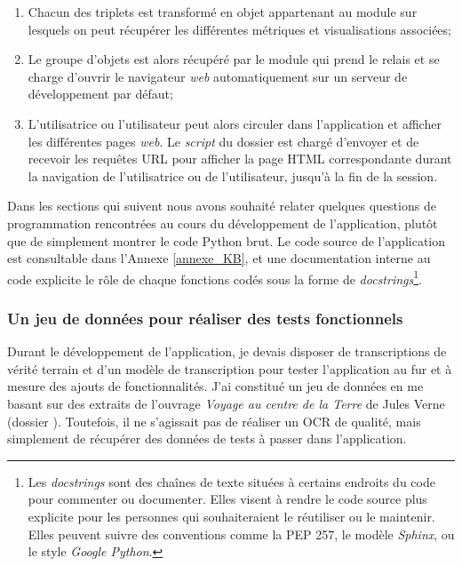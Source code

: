 \begin{enumerate}
    \item Chacun des triplets est transformé en objet  appartenant au module  sur lesquels on peut récupérer les différentes métriques et visualisations associées;
    \item Le groupe d'objets est alors récupéré par le module  qui prend le relais et se charge d'ouvrir le navigateur \textit{web} automatiquement sur un serveur de développement par défaut;
    \item L'utilisatrice ou l'utilisateur peut alors circuler dans l'application et afficher les différentes pages \textit{web}. Le \textit{script}  du dossier  est chargé d'envoyer et de recevoir les requêtes URL pour afficher la page HTML correspondante durant la navigation de l'utilisatrice ou de l'utilisateur, jusqu'à la fin de la session.
\end{enumerate}

Dans les sections qui suivent nous avons souhaité relater quelques questions de programmation rencontrées au cours du développement de l'application, plutôt que de simplement montrer le code Python brut. 
Le code source de l'application est consultable dans l'Annexe \ref{annexe_KB}, et une documentation interne au code explicite le rôle de chaque fonctions codés sous la forme de \textit{docstrings}\footnote{Les \textit{docstrings} sont des chaînes de texte situées à certains endroits du code pour commenter ou documenter. Elles visent à rendre le code source plus explicite pour les personnes qui souhaiteraient le réutiliser ou le maintenir. Elles peuvent suivre des conventions comme la PEP 257, le modèle \textit{Sphinx}, ou le style \textit{Google Python}.}. 

\subsubsection{Un jeu de données pour réaliser des tests fonctionnels}

Durant le développement de l'application, je devais disposer de transcriptions de vérité terrain et d'un modèle de transcription pour tester l'application au fur et à mesure des ajouts de fonctionnalités. J'ai constitué un jeu de données en me basant sur des extraits de l'ouvrage \textit{Voyage au centre de la Terre} de Jules Verne (dossier ). Toutefois, il ne s'agissait pas de réaliser un OCR de qualité, mais simplement de récupérer des données de tests à passer dans l'application.

